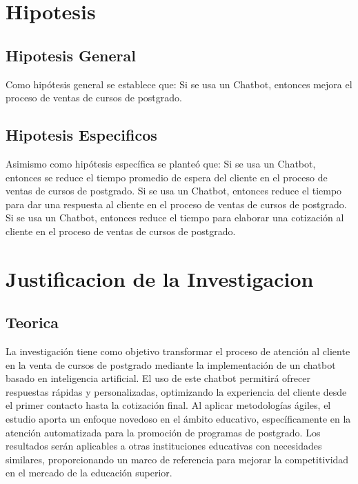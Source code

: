 \documentclass[10pt,a4paper]{article}
\begin{document}
 		    
	\section{Hipotesis}
		    
	\subsection{Hipotesis General}

	Como hipótesis general se establece que: Si se usa un Chatbot, entonces mejora el proceso de ventas de cursos de postgrado.

 

    \subsection{Hipotesis Especificos}
	Asimismo como hipótesis específica se planteó que: Si se usa un Chatbot, entonces se reduce el tiempo promedio de espera del cliente en el proceso de ventas de cursos de postgrado. Si se usa un Chatbot, entonces reduce el tiempo para dar una respuesta al cliente en el proceso de ventas de cursos de postgrado. Si se usa un Chatbot, entonces reduce el tiempo para elaborar una cotización al cliente en el proceso de ventas de cursos de postgrado.

 		    
	\section{Justificacion de la Investigacion}
		    
	\subsection{Teorica}

	La investigación tiene como objetivo transformar el proceso de atención al cliente en la venta de cursos de postgrado mediante la implementación de un chatbot basado en inteligencia artificial. El uso de este chatbot permitirá ofrecer respuestas rápidas y personalizadas, optimizando la experiencia del cliente desde el primer contacto hasta la cotización final. Al aplicar metodologías ágiles, el estudio aporta un enfoque novedoso en el ámbito educativo, específicamente en la atención automatizada para la promoción de programas de postgrado. Los resultados serán aplicables a otras instituciones educativas con necesidades similares, proporcionando un marco de referencia para mejorar la competitividad en el mercado de la educación superior.
\end{document}
